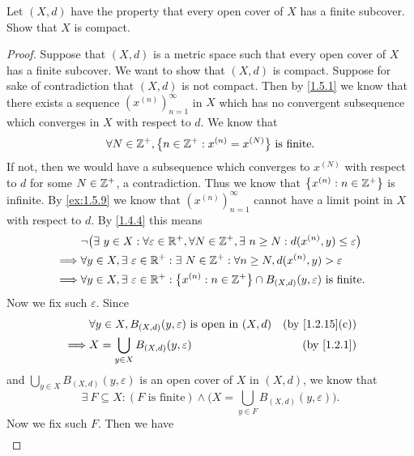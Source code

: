 \begin{ex}\label{ex:1.5.11}
  Let \((X, d)\) have the property that every open cover of \(X\) has a finite subcover.
  Show that \(X\) is compact.
\end{ex}

\begin{proof}
  Suppose that \((X, d)\) is a metric space such that every open cover of \(X\) has a finite subcover.
  We want to show that \((X, d)\) is compact.
  Suppose for sake of contradiction that \((X, d)\) is not compact.
  Then by \cref{1.5.1} we know that there exists a sequence \((x^{(n)})_{n = 1}^\infty\) in \(X\) which has no convergent subsequence which converges in \(X\) with respect to \(d\).
  We know that
  \[
    \forall N \in \mathbb{Z}^+, \big\{n \in \mathbb{Z}^+ : x^{(n)} = x^{(N)}\big\} \text{ is finite}.
  \]
  If not, then we would have a subsequence which converges to \(x^{(N)}\) with respect to \(d\) for some \(N \in \mathbb{Z}^+\), a contradiction.
  Thus we know that \(\big\{x^{(n)} : n \in \mathbb{Z}^+\big\}\) is infinite.
  By \cref{ex:1.5.9} we know that \((x^{(n)})_{n = 1}^\infty\) cannot have a limit point in \(X\) with respect to \(d\).
  By \cref{1.4.4} this means
  \begin{align*}
             & \lnot\big(\exists\ y \in X : \forall \varepsilon \in \mathbb{R}^+, \forall N \in \mathbb{Z}^+, \exists\ n \geq N : d(x^{(n)}, y) \leq \varepsilon\big) \\
    \implies & \forall y \in X, \exists\ \varepsilon \in \mathbb{R}^+ : \exists\ N \in \mathbb{Z}^+ : \forall n \geq N, d(x^{(n)}, y) > \varepsilon                   \\
    \implies & \forall y \in X, \exists\ \varepsilon \in \mathbb{R}^+ : \big\{x^{(n)} : n \in \mathbb{Z}^+\big\} \cap B_{(X, d)}(y, \varepsilon) \text{ is finite}.
  \end{align*}
  Now we fix such \(\varepsilon\).
  Since
  \begin{align*}
             & \forall y \in X, B_{(X, d)}(y, \varepsilon) \text{ is open in } (X, d) & \text{(by \cref{1.2.15}(c))} \\
    \implies & X = \bigcup_{y \in X} B_{(X, d)}(y, \varepsilon)                       & \text{(by \cref{1.2.1})}
  \end{align*}
  and \(\bigcup_{y \in X} B_{(X, d)}(y, \varepsilon)\) is an open cover of \(X\) in \((X, d)\), we know that
  \[
    \exists\ F \subseteq X : (F \text{ is finite}) \land \bigg(X = \bigcup_{y \in F} B_{(X, d)}(y, \varepsilon)\bigg).
  \]
  Now we fix such \(F\).
  Then we have
  \begin{align*}

\end{align*}
\end{proof}
